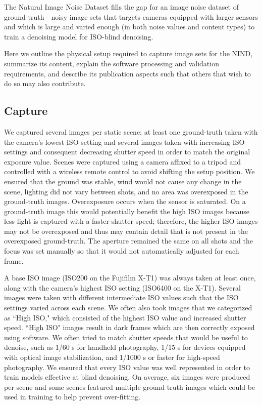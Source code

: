 The Natural Image Noise Dataset fills the gap for an image noise dataset of ground-truth - noisy image sets that targets cameras equipped with larger sensors and which is large and varied enough (in both noise values and content types) to train a denoising model for ISO-blind denoising.

Here we outline the physical setup required to capture image sets for the NIND, summarize its content, explain the software processing and validation requirements, and describe its publication aspects such that others that wish to do so may also contribute.
\subsection{Capture}
We captured several images per static scene; at least one ground-truth taken with the camera's lowest ISO setting and several images taken with increasing ISO settings and consequent decreasing shutter speed in order to match the original exposure value. Scenes were captured using a camera affixed to a tripod and controlled with a wireless remote control to avoid shifting the setup position. We ensured that the ground was stable, wind would not cause any change in the scene, lighting did not vary between shots, and no area was overexposed in the ground-truth images. Overexposure occurs when the sensor is saturated. On a ground-truth image this would potentially benefit the high ISO images because less light is captured with a faster shutter speed; therefore, the higher ISO images may not be overexposed and thus may contain detail that is not present in the overexposed ground-truth. The aperture remained the same on all shots and the focus was set manually so that it would not automatically adjusted for each frame.

A base ISO image (ISO200 on the Fujifilm X-T1) was always taken at least once, along with the camera's highest ISO setting (ISO6400 on the X-T1). Several images were taken with different intermediate ISO values such that the ISO settings varied across each scene. We often also took images that we categorized as ``High ISO," which consisted of the highest ISO value and increased shutter speed. ``High ISO" images result in dark frames which are then correctly exposed using software. We often tried to match shutter speeds that would be useful to denoise, such as 1/60 s for handheld photography, 1/15 s for devices equipped with optical image stabilization, and 1/1000 s or faster for high-speed photography. We ensured that every ISO value was well represented in order to train models effective at blind denoising. On average, six images were produced per scene and some scenes featured multiple ground truth images which could be used in training to help prevent over-fitting.
